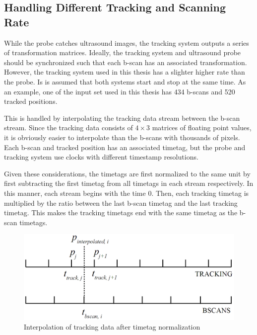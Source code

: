 \subsection{Handling Different Tracking and Scanning Rate}

	While the probe catches ultrasound images, the tracking system outputs a series of transformation matrices. Ideally, the tracking system and ultrasound probe should be synchronized such that each b-scan has an associated transformation. However, the tracking system used in this thesis has a slighter higher rate than the probe.  Is is assumed that both systems start and stop at the same time. As an example, one of the input set used in this thesis has 434 b-scans and 520 tracked positions.
	
	This is handled by interpolating the tracking data stream between the b-scan stream. Since the tracking data consists of $4 \times 3$ matrices of floating point values, it is obviously easier to interpolate than the b-scans with thousands of pixels. Each b-scan and tracked position has an associated timetag, but the probe and tracking system use clocks with different timestamp resolutions.
	
	Given these considerations, the timetags are first normalized to the same unit by first subtracting the first timetag from all timetags in each stream respectively. In this manner, each stream begins with the time 0. Then, each tracking timetag is multiplied by the ratio between the last b-scan timetag and the last tracking timetag. This makes the tracking timetags end with the same timetag as the b-scan timetags.
	
	\begin{figure}[h]
	\centering
	\includegraphics[width=\textwidth]{graphics/tracking_scanning_interpolation.png}
	\caption{Interpolation of tracking data after timetag normalization}
	\label{fig:tracking_scanning_interpolation}
	\end{figure}
	
